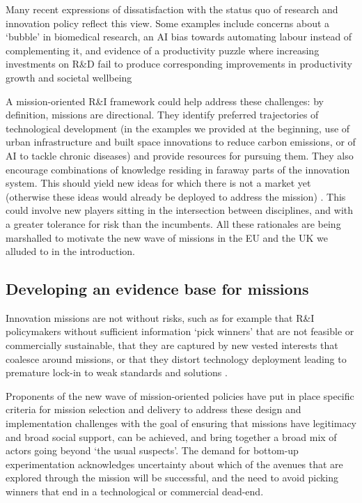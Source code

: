 \documentclass[11pt]{article}
\begin{document}
Many recent expressions of dissatisfaction with the status quo of research and innovation policy reflect this view. Some examples include concerns about a `bubble' in biomedical research, an AI bias towards automating labour instead of complementing it, and evidence of a productivity puzzle where increasing investments on R\&D fail to produce corresponding improvements in productivity growth and societal well\-being \citep{jones_biomedical_2018, sarewitz_saving_2016, acemoglu_artificial_2018, restrepo_wrong_2018}

A mission-oriented R&I framework could help address these challenges: by definition, missions are directional. They identify preferred trajectories of technological development (in the examples we provided at the beginning, use of urban infrastructure and built space innovations to reduce carbon emissions, or of AI to tackle chronic diseases) and provide resources for pursuing them. They also encourage combinations of knowledge residing in faraway parts of the innovation system. This should yield new ideas for which there is not a market yet (otherwise these ideas would already be deployed to address the mission) \citep{gustafsson_failure_2011}. This could involve new players sitting in the intersection between disciplines, and with a greater tolerance for risk than the incumbents.  All these rationales are being marshalled to motivate the new wave of missions in the EU and the UK we alluded to in the introduction.

\subsection{Developing an evidence base for missions}

Innovation missions are not without risks, such as for example that R\&I policymakers without sufficient information `pick winners’ that are not feasible or commercially sustainable, that they are captured by new vested interests that coalesce around missions, or that they distort technology deployment leading to premature lock-in to weak standards and solutions \citep{aghion_science_2009}. 

Proponents of the new wave of mission-oriented policies have put in place specific criteria for mission selection and delivery to address these design and implementation challenges with the goal of ensuring that missions have legitimacy and broad social support, can be achieved, and bring together a broad mix of actors going beyond `the usual suspects'. The demand for bottom-up experimentation acknowledges uncertainty about which of the avenues that are explored through the mission will be successful, and the need to avoid picking winners that end in a technological or commercial dead-end.  
\end{document}
